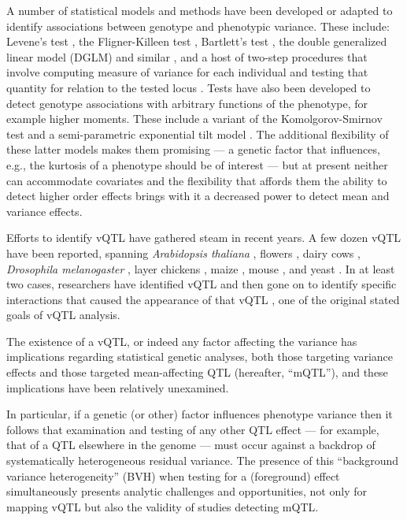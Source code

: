 A number of statistical models and methods have been developed or adapted to identify associations between genotype and phenotypic variance. 
These include: 
    Levene's test \citep{Struchalin2010},
    the Fligner-Killeen test \citep{Fraser2010},
    Bartlett's test \citep{Freund2013b},
    the double generalized linear model (DGLM) and similar \citep{Ronnegard2011a, Cao2014},
    and a host of two-step procedures that involve computing measure of variance for each individual and testing that quantity for relation to the tested locus \citep{Brown2014-kv,Ayroles2015,Forsberg2015-jy}.
Tests have also been developed to detect genotype associations with arbitrary functions of the phenotype, for example higher moments.
These include a variant of the Komolgorov-Smirnov test \citep{Aschard2013} and a semi-parametric exponential tilt model \citep{Hong2016}.
The additional flexibility of these latter models makes them promising --- a genetic factor that influences, e.g., the kurtosis of a phenotype should be of interest --- but at present neither can accommodate covariates and the flexibility that affords them the ability to detect higher order effects brings with it a decreased power to detect mean and variance effects. 

Efforts to identify vQTL have gathered steam in recent years.
A few dozen vQTL have been reported, spanning \textit{Arabidopsis thaliana} \citep{Jimenez-Gomez2011a,Shen2012,Forsberg2014-je}, flowers \citep{Lee2014-wp}, dairy cows \citep{Fikse2012-vm}, \textit{Drosophila melanogaster} \citep{Ayroles2015,Huang2015-ar}, layer chickens \citep{Wolc2012-sq}, maize \citep{Ordas2008}, mouse \citep{Gray2015}, and yeast \citep{Nelson2013-ld,Ziv2017-cf,Forsberg2017-bv}.
In at least two cases, researchers have identified vQTL and then gone on to identify specific interactions that caused the appearance of that vQTL \citep{Huang2015-ar,Brown2017-pt}, one of the original stated goals of vQTL analysis.

The existence of a vQTL, or indeed any factor affecting the variance has implications regarding statistical genetic analyses, both those targeting variance effects and those targeted mean-affecting QTL (hereafter, ``mQTL''), and these implications have been relatively unexamined. 

In particular, if a genetic (or other) factor influences phenotype variance then it follows that examination and testing of any other QTL effect --- for example, that of a QTL elsewhere in the genome --- must occur against a backdrop of systematically heterogeneous residual variance.
The presence of this ``background variance heterogeneity'' (BVH) when testing for a (foreground) effect simultaneously presents analytic challenges and opportunities, not only for mapping vQTL but also the validity of studies detecting mQTL. 

